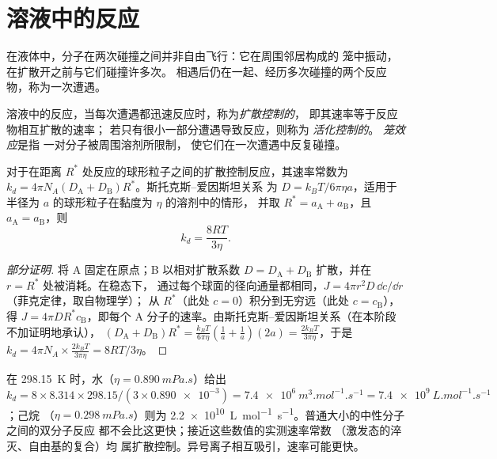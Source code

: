 \section{溶液中的反应}

在液体中，分子在两次碰撞之间并非自由飞行：它在周围邻居构成的
笼中振动，在扩散开之前与它们碰撞许多次。
相遇后仍在一起、经历多次碰撞的两个反应物，称为一次遭遇。

\begin{definition}\label{def:b3:rate-theories:diffusion}
溶液中的反应，当每次遭遇都迅速反应时，称为\emph{扩散控制的}，
即其速率等于反应物相互扩散的速率；
若只有很小一部分遭遇导致反应，则称为
\emph{活化控制的}。
\emph{笼效应}是指
一对分子被周围溶剂所限制，
使它们在一次遭遇中反复碰撞。
\end{definition}

\begin{proposition}[斯莫卢霍夫斯基极限]\label{prop:b3:rate-theories:smoluchowski}
对于在距离 $R^*$ 处反应的球形粒子之间的扩散控制反应，其速率常数为
$k_d = 4\pi N_A(D_{\mathrm A} + D_{\mathrm B})R^*$。斯托克斯–爱因斯坦关系
为 $D = k_BT/6\pi\eta a$，适用于半径为 $a$ 的球形粒子在黏度为 $\eta$ 的溶剂中的情形，
并取 $R^* = a_{\mathrm A} + a_{\mathrm B}$，且 $a_{\mathrm A} = a_{\mathrm B}$，则
\[
  k_d = \frac{8RT}{3\eta} .
\]
\end{proposition}

\begin{proof}[部分证明]
将 A 固定在原点；B 以相对扩散系数 $D =
D_{\mathrm A} + D_{\mathrm B}$ 扩散，并在 $r = R^*$ 处被消耗。在稳态下，
通过每个球面的径向通量都相同，$J = 4\pi r^2D\,\dd c/\dd r$（菲克定律，取自物理学）；
从 $R^*$（此处 $c = 0$）积分到无穷远（此处 $c = c_{\mathrm B}$），
得 $J = 4\pi DR^*c_{\mathrm B}$，即每个 A 分子的速率。由斯托克斯–爱因斯坦关系（在本阶段不加证明地承认），
$(D_{\mathrm A} + D_{\mathrm B})R^* = \frac{k_BT}{6\pi\eta}(\frac{1}{a} + \frac1a)(2a) = \frac{2k_BT}{3\pi\eta}$，于是 $k_d = 4\pi N_A \times
\frac{2k_BT}{3\pi\eta} = 8RT/3\eta$。
\end{proof}

\begin{example}[水和己烷中的速率上限]\label{ex:b3:rate-theories:speed-limit}
在 \qty{298.15}{K} 时，水（$\eta = \qty{0.890}{mPa.s}$）给出 $k_d = 8 \times 8.314 \times
298.15/(3 \times \num{0.890e-3}) = \qty{7.4e6}{m^3.mol^{-1}.s^{-1}} = \qty{7.4e9}{L.mol^{-1}.s^{-1}}$；己烷
（$\eta = \qty{0.298}{mPa.s}$）则为 \qty{2.2e10}{L.mol^{-1}.s^{-1}}。普通大小的中性分子之间的双分子反应
都不会比这更快；接近这些数值的实测速率常数
（激发态的淬灭、自由基的复合）均
属扩散控制。异号离子相互吸引，速率可能更快。
\end{example}

